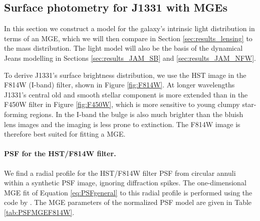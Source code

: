 \subsection{Surface photometry for J1331 with MGEs} \label{sec:MGE_results}

In this section we construct a model for the galaxy's intrinsic light distribution in terms of an MGE, which we will then compare in Section \ref{sec:results_lensing} to the mass distribution. The light model will also be the basis of the dynamical Jeans modelling in Sections \ref{sec:results_JAM_SB} and \ref{sec:results_JAM_NFW}.

To derive J1331's surface brightness distribution, we use the HST image in the F814W (I-band) filter, shown in Figure \ref{fig:F814W}. At longer wavelengths J1331's central old and smooth stellar component is more extended than in the F450W filter in Figure \ref{fig:F450W}, which is more sensitive to young clumpy star-forming regions. In the I-band the bulge is also much brighter than the bluish lens images and the imaging is less prone to extinction. The F814W image is therefore best suited for fitting a MGE. 

\paragraph{PSF for the HST/F814W filter.} We find a radial profile for the HST/F814W filter PSF from circular annuli within a synthetic PSF image, ignoring diffraction spikes. The one-dimensional MGE fit of Equation \ref{eq:PSFgeneral} to this radial profile is performed using the code by \citet{Cap02}. The MGE parameters of the normalized PSF model are given in Table \ref{tab:PSFMGEF814W}.

